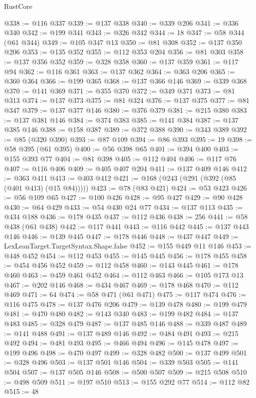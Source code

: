\begin{lexlean}{RustCore}
\begin{coremodule}
@338 := @116 @337
@339 := @137 @338
@340 := @339 @206
@341 := @336 @340
@342 := @199 @341
@343 := @326 @342
@344 := 18
@347 := @58 @344 (@61 @344)
@349 := @105 @347 @13
@350 := @81 @308
@352 := @137 @350 @206
@353 := @135 @352
@355 := @112 @353 @204
@356 := @81 @303
@358 := @137 @356 @352
@359 := @328 @358
@360 := @137 @359
@361 := @117 @94
@362 := @116 @361
@363 := @137 @362
@364 := @363 @206
@365 := @360 @364
@366 := @199 @365
@368 := @137 @366 @146
@369 := @339 @368
@370 := @141 @369
@371 := @355 @370
@372 := @349 @371
@373 := @81 @313
@374 := @137 @373
@375 := @81 @324
@376 := @137 @375
@377 := @81 @347
@379 := @137 @377 @146
@380 := @376 @379
@381 := @215 @380
@383 := @137 @381 @146
@384 := @374 @383
@385 := @141 @384
@387 := @137 @385 @146
@388 := @158 @387
@389 := @372 @388
@390 := @343 @389
@392 := @85 (@320 @390)
@393 := @87 @109
@394 := @86 @393
@395 := 19
@398 := @58 @395 (@61 @395)
@400 := @56 @398 @65
@401 := @394 @400
@403 := @155 @393 @77
@404 := @81 @398
@405 := @112 @404
@406 := @117 @76
@407 := @116 @406
@409 := @405 @407 @204
@411 := @137 @409 @146
@412 := @363 @411
@413 := @403 @412
@421 := @168 (@243 (@291 (@392 (@85 (@401 @413) (@15 @84)))))
@423 := @78 (@83 @421)
@424 := @53 @423
@426 := @56 @109 @65
@427 := @100 @426
@428 := @95 @427
@429 := @90 @428
@430 := @64 @429
@433 := @54 @430 @24 @77
@434 := @137 @113
@435 := @434 @188
@436 := @178 @435
@437 := @112 @436
@438 := 256
@441 := @58 @438 (@61 @438)
@442 := @117 @441
@443 := @116 @442
@445 := @137 @443 @146
@446 := @139 @445
@447 := @178 @446
@448 := @437 @447
@449 := LexLeanTarget.TargetSyntax.Shape.false
@452 := @155 @449 @11 @146
@453 := @448 @452
@454 := @112 @453
@455 := @145 @445
@456 := @178 @455
@458 := @454 @456 @452
@459 := @112 @458
@460 := @143 @445
@461 := @178 @460
@463 := @459 @461 @452
@464 := @112 @463
@466 := @105 @173 @13
@467 := @202 @146
@468 := @434 @467
@469 := @178 @468
@470 := @112 @469
@471 := 64
@474 := @58 @471 (@61 @471)
@475 := @117 @474
@476 := @116 @475
@478 := @137 @476 @206
@479 := @139 @478
@480 := @199 @479
@481 := @470 @480
@482 := @143 @340
@483 := @199 @482
@484 := @137 @483
@485 := @328 @479
@487 := @137 @485 @146
@488 := @339 @487
@489 := @141 @488
@491 := @137 @489 @146
@492 := @484 @491
@493 := @215 @492
@494 := @481 @493
@495 := @466 @494
@496 := @145 @478
@497 := @199 @496
@498 := @470 @497
@499 := @328 @482
@500 := @137 @499
@501 := @328 @496
@503 := @137 @501 @146
@504 := @339 @503
@505 := @141 @504
@507 := @137 @505 @146
@508 := @500 @507
@509 := @215 @508
@510 := @498 @509
@511 := @197 @510
@513 := @155 @292 @77
@514 := @112 @82
@515 := 48

\end{coremodule}
\end{lexlean}
